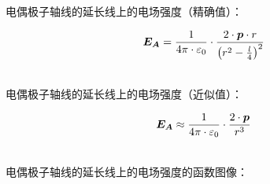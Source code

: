 \documentclass[UTF8]{ctexart}
\newcommand*{\veb}[1]{\vb*{#1}}
\begin{document}
    电偶极子轴线的延长线上的电场强度（精确值）：
    \begin{large}
        \begin{equation*}
            \veb{E_A}=\frac{1}{4\pi\cdot\varepsilon_0}\cdot\frac{2\cdot \veb{p}\cdot r}{\left(r^2-\frac{l}{4}\right)^2}
        \end{equation*}
    \end{large}\\
    电偶极子轴线的延长线上的电场强度（近似值）：
    \begin{large}
        \begin{equation*}
            \veb{E_A}\approx\frac{1}{4\pi\cdot\varepsilon_0}\cdot\frac{2\cdot \veb{p}}{r^3}
        \end{equation*}
    \end{large}\\
    电偶极子轴线的延长线上的电场强度的函数图像：
\end{document}
